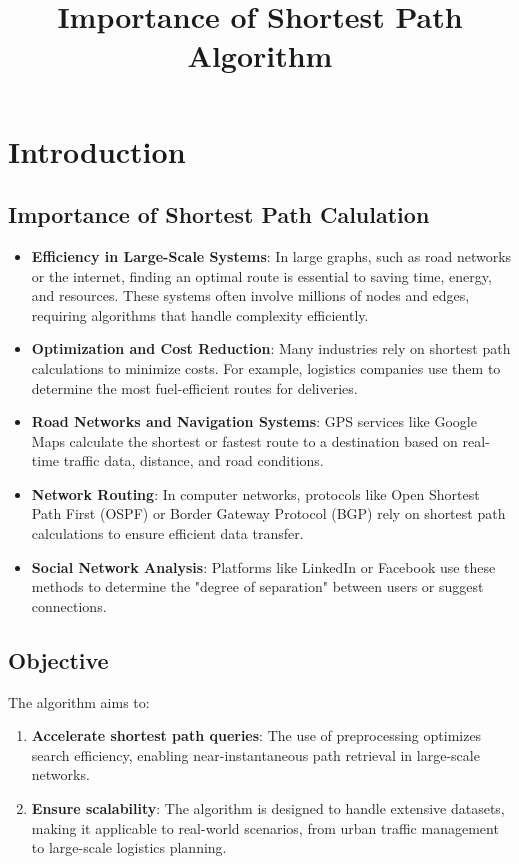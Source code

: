 \chapter{Introduction}

\title{Importance of Shortest Path Algorithm}

	\section{Importance of Shortest Path Calulation}
	\begin{itemize}
		\item \textbf{Efficiency in Large-Scale Systems}: In large graphs, such as road networks or the internet, finding an optimal route is essential to saving time, energy, and resources. These systems often involve millions of nodes and edges, requiring algorithms that handle complexity efficiently.
		\item \textbf{Optimization and Cost Reduction}: Many industries rely on shortest path calculations to minimize costs. For example, logistics companies use them to determine the most fuel-efficient routes for deliveries.
		\item \textbf{Road Networks and Navigation Systems}: GPS services like Google Maps calculate the shortest or fastest route to a destination based on real-time traffic data, distance, and road conditions.
		\item \textbf{Network Routing}: In computer networks, protocols like Open Shortest Path First (OSPF) or Border Gateway Protocol (BGP) rely on shortest path calculations to ensure efficient data transfer.
		\item \textbf{Social Network Analysis}: Platforms like LinkedIn or Facebook use these methods to determine the "degree of separation" between users or suggest connections.
	\end{itemize}

	\section{Objective}
	The algorithm aims to:
	\begin{enumerate}
		\item \textbf{Accelerate shortest path queries}: The use of preprocessing optimizes search efficiency, enabling near-instantaneous path retrieval in large-scale networks.
		\item \textbf{Ensure scalability}: The algorithm is designed to handle extensive datasets, making it applicable to real-world scenarios, from urban traffic management to large-scale logistics planning.
	\end{enumerate}
	
